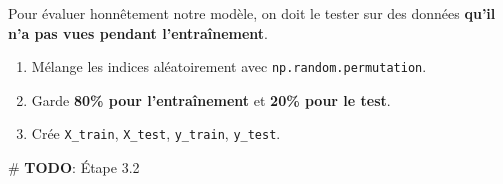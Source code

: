 \documentclass[
  french,
  11pt,
  a4paper,
]{scrbook}
\newenvironment{Shaded}{}{}
\newcommand{\AlertTok}[1]{\textcolor[rgb]{1.00,0.33,0.33}{\textbf{#1}}}
\newcommand{\CommentTok}[1]{\textcolor[rgb]{0.42,0.45,0.49}{#1}}
\providecommand{\tightlist}{%
  \setlength{\itemsep}{0pt}\setlength{\parskip}{0pt}}
\begin{document}
\begin{tcolorbox}[enhanced jigsaw, arc=.35mm, bottomrule=.15mm, bottomtitle=1mm, breakable, colback=white, colbacktitle=quarto-callout-note-color!10!white, colframe=quarto-callout-note-color-frame, coltitle=black, left=2mm, leftrule=.75mm, opacityback=0, opacitybacktitle=0.6, rightrule=.15mm, title={📝 À faire}, titlerule=0mm, toprule=.15mm, toptitle=1mm]

Pour évaluer honnêtement notre modèle, on doit le tester sur des données
\textbf{qu'il n'a pas vues pendant l'entraînement}.

\begin{enumerate}
\def\labelenumi{\arabic{enumi}.}
\tightlist
\item
  Mélange les indices aléatoirement avec \texttt{np.random.permutation}.
\item
  Garde \textbf{80\% pour l'entraînement} et \textbf{20\% pour le test}.
\item
  Crée \texttt{X\_train}, \texttt{X\_test}, \texttt{y\_train},
  \texttt{y\_test}.
\end{enumerate}

\end{tcolorbox}

\begin{Shaded}
\begin{Highlighting}[]
\CommentTok{\# }\AlertTok{TODO}\CommentTok{: Étape 3.2}
\end{Highlighting}
\end{Shaded}
\end{document}

